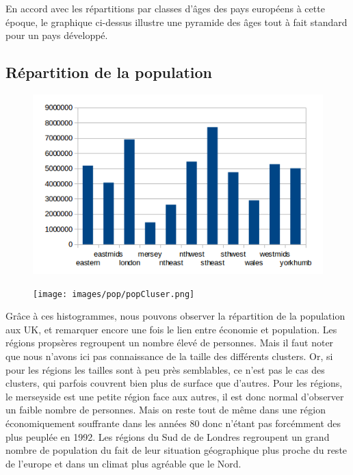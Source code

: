 En accord avec les répartitions par classes d'âges des pays européens à cette époque, le graphique ci-dessus illustre une pyramide des âges tout à fait standard pour un pays développé.
\pagebreak


\subsection{Répartition de la population}

\begin{figure}[h!]
    \centering
    \includegraphics[width=\linewidth]{images/pop/popRegion.png}
\end{figure}

\begin{figure}[h!]
    \centering
    \texttt{[image: images/pop/popCluser.png]}
\end{figure}

Grâce à ces histogrammes, nous pouvons observer la répartition de la population aux UK, et remarquer encore une fois le lien entre économie et population. Les régions propsères regroupent un nombre élevé de personnes. Mais il faut noter que nous n'avons ici pas connaissance de la taille des différents clusters. Or, si pour les régions les tailles sont à peu près semblables, ce n'est pas le cas des clusters, qui parfois couvrent bien plus de surface que d'autres. Pour les régions, le merseyside est une petite région face aux autres, il est donc normal d'observer un faible nombre de personnes. Mais on reste tout de même dans une région économiquement souffrante dans les années 80 donc n'étant pas forcémment des plus peuplée en 1992.
Les régions du Sud de de Londres regroupent un grand nombre de population du fait de leur situation géographique plus proche du reste de l'europe et dans un climat plus agréable que le Nord.

